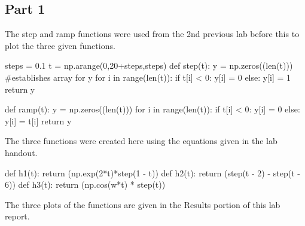 \documentclass[12pt]{article}
\begin{document}
\subsection{Part 1}
The step and ramp functions were used from the 2nd previous lab before this to plot the three given functions.
\begin{python}
steps = 0.1
t = np.arange(0,20+steps,steps)
def step(t):
    y = np.zeros((len(t))) #establishes array for y
    for i in range(len(t)):
        if t[i] < 0:
             y[i] = 0 
        else:
             y[i] = 1
    return y

def ramp(t):
    y = np.zeros((len(t)))
    for i in range(len(t)):
        if t[i] < 0:
            y[i] = 0
        else:
            y[i] = t[i]
    return y
\end{python}  
The three functions were created here using the equations given in the lab handout.
\begin{python}
def h1(t):
    return (np.exp(2*t)*step(1 - t))
def h2(t):
    return (step(t - 2) - step(t - 6))
def h3(t):
    return (np.cos(w*t) * step(t))
\end{python}
The three plots of the functions are given in the Results portion of this lab report.
\end{document}
